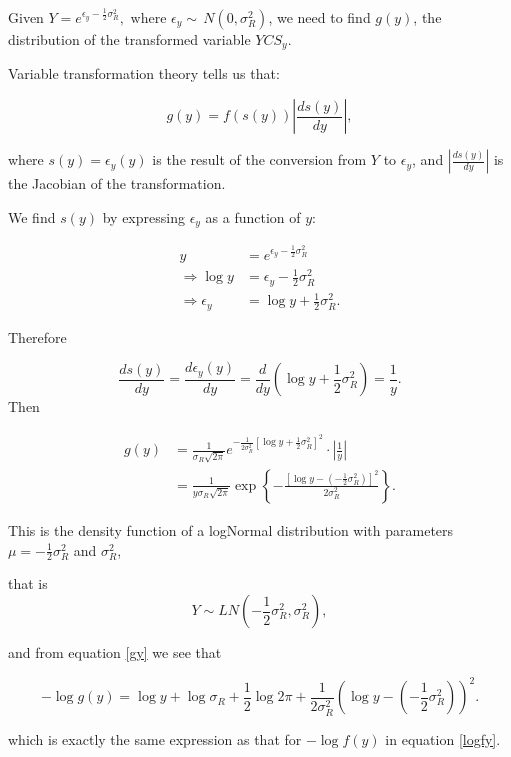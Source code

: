 \begin{appendices}
Given
\(Y = e^{\epsilon_y - \frac{1}{2}\sigma^2_R},\,\, \text{where } \epsilon_y \sim \,N(0, \sigma^2_R)\),
we need to find \(g(y)\), the distribution of the transformed variable
\(YCS_y\).

Variable transformation theory tells us that:

\[g(y) = f(s(y))\left\vert \frac{d s(y)}{dy}\right\vert,\]

where \(s(y)=\epsilon_y(y)\) is the result of the conversion from \(Y\)
to \(\epsilon_y\), and \(\left\vert \frac{d s(y)}{dy}\right\vert\) is
the Jacobian of the transformation.

We find \(s(y)\) by expressing \(\epsilon_y\) as a function of \(y\):

\begin{align}
y &= e^{\epsilon_y - \frac{1}{2}\sigma^2_R} \nonumber \\
\Rightarrow \log y &= \epsilon_y - \frac{1}{2}\sigma^2_R \nonumber \\
\Rightarrow \epsilon_y &= \log y + \frac{1}{2}\sigma^2_R.
\end{align}

Therefore

\[\frac{d s(y)}{dy} = \frac{d \epsilon_y(y)}{dy} = \frac{d}{dy}\left(\log y + \frac{1}{2}\sigma^2_R\right) =\frac{1}{y}.\]
Then

\begin{align}
g(y) &= \frac{1}{\sigma_R\sqrt{2\pi}}e^{-\frac{1}{2\sigma_R^2}\left[\log y + \frac{1}{2}\sigma^2_R \right]^2}\cdot \left\vert \frac{1}{y}\right\vert \nonumber \\
&=\frac{1}{y\sigma_R\sqrt{2\pi}}\exp\left\{-\frac{[\log y - (-\frac{1}{2}\sigma^2_R)]^2}{2\sigma^2_R}\right\}.
\label{gy}
\end{align}

This is the density function of a logNormal distribution with parameters
\(\mu= -\frac{1}{2}\sigma^2_R\) and \(\sigma^2_R\),

that is \[Y \sim LN\left(-\frac{1}{2}\sigma^2_R, \sigma^2_R\right),\]

and from equation \ref{gy} we see that

\begin{equation}
-\log g(y)= \log y + \log \sigma_R + \frac{1}{2}\log 2\pi + \frac{1}{2\sigma_R^2}\left(\log y - (-\frac{1}{2}\sigma^2_R)\right)^2.
\label{loggy}
\end{equation}

which is exactly the same expression as that for \(-\log f(y)\) in
equation \ref{logfy}.


\end{appendices}
